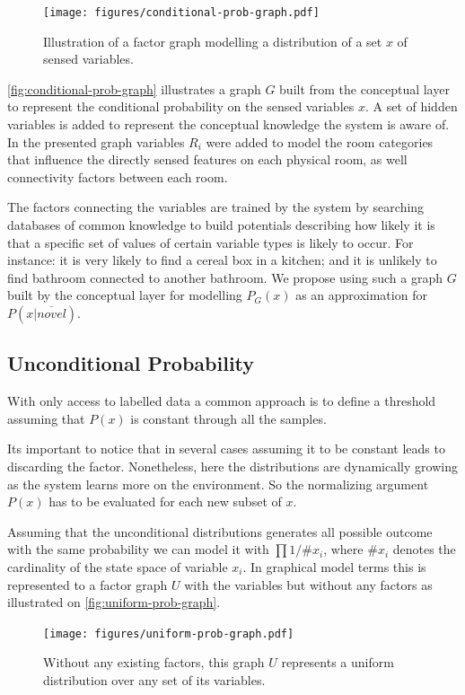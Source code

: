 \documentclass[runningheads,a4paper]{llncs}
\begin{document}
\begin{figure}[h]
\centering
\texttt{[image: figures/conditional-prob-graph.pdf]}
\caption{\label{fig:conditional-prob-graph}Illustration of a factor graph modelling
         a distribution of a set $x$ of sensed variables.}
\end{figure}

\autoref{fig:conditional-prob-graph} illustrates a graph $G$ built from the conceptual
layer to represent the conditional probability on the sensed variables $x$.
A set of hidden variables is added to represent the conceptual knowledge the system is aware of.
In the presented graph variables $R_i$ were added to model the room categories that influence
the directly sensed features on each physical room, as well connectivity factors between each
room.

The factors connecting the variables are trained by the system by searching databases of
common knowledge to build potentials describing how likely it is that a specific set of
values of certain variable types is likely to occur.
For instance: it is very likely to find a cereal box in a kitchen; and it is unlikely to find
bathroom connected to another bathroom.
We propose using such a graph $G$ built by the conceptual layer for modelling $P_G(x)$
as an approximation for $P(x|\overline{novel})$.

\subsection{Unconditional Probability}
\label{sec:unconditional-prob}
With only access to labelled data a common approach is to define a threshold assuming
that $P(x)$ is constant through all the samples.

Its important to notice that in several cases assuming it to be constant leads to
discarding the factor.
Nonetheless, here the distributions are dynamically growing as the system learns
more on the environment.
So the normalizing argument $P(x)$ has to be evaluated for each new subset of $x$.

Assuming that the unconditional distributions generates all possible outcome with
the same probability we can model it with $\prod{1/\# x_i}$,
where $\# x_i$ denotes the cardinality of the state space of variable $x_i$.
In graphical model terms this is represented to a factor graph $U$ with the
variables but without any factors as illustrated on \autoref{fig:uniform-prob-graph}.

\begin{figure}[h]
\centering
\texttt{[image: figures/uniform-prob-graph.pdf]}
\caption{\label{fig:uniform-prob-graph}Without any existing factors, this graph $U$ represents a
         uniform distribution over any set of its variables.}
\end{figure}
\end{document}
